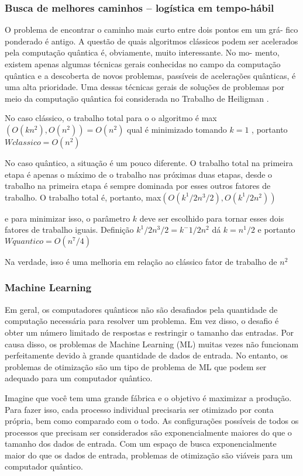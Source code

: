 \subsubsection{Busca de melhores caminhos – logística em tempo-hábil}
O problema de encontrar o caminho mais curto entre dois pontos em um grá- fico ponderado é antigo. A questão de quais algoritmos clássicos podem ser acelerados pela computação quântica é, obviamente, muito interessante. No mo- mento, existem apenas algumas técnicas gerais conhecidas no campo da computação quântica e a descoberta de novos problemas, passíveis de acelerações quânticas, é uma alta prioridade. Uma dessas técnicas gerais de soluções de problemas por meio da computação quântica foi considerada no Trabalho de Heiligman  \cite{21}.

No caso clássico, o trabalho total para o o algoritmo é max $ (O(kn^2),  O(n^2)) = O(n^2) $  qual é minimizado tomando $ k = 1 $ , portanto $ W classico=O(n^2) $

No caso quântico, a situação é um pouco diferente. O trabalho total na primeira etapa é apenas o máximo de o trabalho nas próximas duas etapas, desde o trabalho na primeira etapa é sempre dominada por esses outros fatores de trabalho. O trabalho total é, portanto, max$ (O(k^1/2 n^3/2), O(k^1/2 n^2)) $

e para minimizar isso, o parâmetro $ k $ deve ser escolhido para tornar esses dois fatores de trabalho iguais. Definição $ k^1/2 n^3/2= k^-1/2 n^2 $ dá $ k = n^1/2 $ e portanto $W quantico = O(n^7/4) $

Na verdade, isso é uma melhoria em relação ao clássico fator de trabalho de $ n^2 $

\subsubsection{Machine Learning}
Em geral, os computadores quânticos não são desafiados pela quantidade de computação necessária para resolver um problema. Em vez disso, o desafio é obter um número limitado de respostas e restringir o tamanho das entradas. Por causa disso, os problemas de Machine Learning (ML) muitas vezes não funcionam perfeitamente devido à grande quantidade de dados de entrada. No entanto, os problemas de otimização são um tipo de problema de ML que podem ser adequado para um computador quântico.

Imagine que você tem uma grande fábrica e o objetivo é maximizar a produção. Para fazer isso, cada processo individual precisaria ser otimizado por conta própria, bem como comparado com o todo. As configurações possíveis de todos os processos que precisam ser considerados são exponencialmente maiores do que o tamanho dos dados de entrada. Com um espaço de busca exponencialmente maior do que os dados de entrada, problemas de otimização são viáveis para um computador quântico.
  
